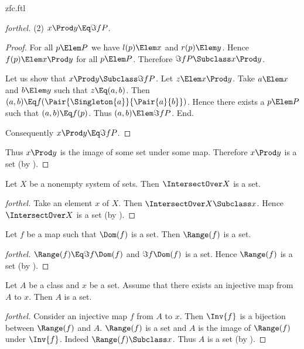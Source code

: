 \documentclass{stex}
\begin{document}
\begin{smodule}{zfc.ftl}
\begin{proof}[forthel]
  (2) $x \Prod y \Eq \Im{f}{P}$.
  \begin{proof}
    For all $p \Elem P$ we have $l(p) \Elem x$ and $r(p) \Elem y$.
    Hence $f(p) \Elem x \Prod y$ for all $p \Elem P$.
    Therefore $\Im{f}{P} \Subclass x \Prod y$.

    Let us show that $x \Prod y \Subclass \Im{f}{P}$.
      Let $z \Elem x \Prod y$.
      Take $a \Elem x$ and $b \Elem y$ such that $z \Eq (a,b)$.
      Then $(a,b) \Eq f(\Pair{\Singleton{a}}{\Pair{a}{b}})$.
      Hence there exists a $p \Elem P$ such that $(a,b) \Eq f(p)$.
      Thus $(a,b) \Elem \Im{f}{P}$.
    End.

    Consequently $x \Prod y \Eq \Im{f}{P}$.
  \end{proof}

  Thus $x \Prod y$ is the image of some set under some map.
  Therefore $x \Prod y$ is a set (by ).
\end{proof}

\begin{proposition*}[forthel]
  Let $X$ be a nonempty system of sets.
  Then $\IntersectOver X$ is a set.
\end{proposition*}
\begin{proof}[forthel]
  Take an element $x$ of $X$.
  Then $\IntersectOver X \Subclass x$.
  Hence $\IntersectOver X$ is a set (by ).
\end{proof}

\begin{proposition*}[forthel]
  Let $f$ be a map such that $\Dom(f)$ is a set.
  Then $\Range(f)$ is a set.
\end{proposition*}
\begin{proof}[forthel]
  $\Range(f) \Eq \Im{f}{\Dom(f)}$ and $\Im{f}{\Dom(f)}$ is a set.
  Hence $\Range(f)$ is a set (by ).
\end{proof}

\begin{proposition*}[forthel]
  Let $A$ be a class and $x$ be a set.
  Assume that there exists an injective map from $A$ to $x$.
  Then $A$ is a set.
\end{proposition*}
\begin{proof}[forthel]
  Consider an injective map $f$ from $A$ to $x$.
  Then $\Inv{f}$ is a bijection between $\Range(f)$ and $A$.
  $\Range(f)$ is a set and $A$ is the image of $\Range(f)$ under $\Inv{f}$.
  Indeed $\Range(f) \Subclass x$.
  Thus $A$ is a set (by ).
\end{proof}


\end{smodule}
\end{document}
